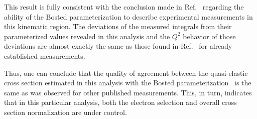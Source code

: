 This result is fully consistent with the conclusion made in Ref.~\cite{note_QE_peak} regarding the ability of the Bosted parameterization to describe experimental measurements in this kinematic region. The deviations of the measured integrals from their parameterized values revealed in this analysis and the $Q^{2}$ behavior of those deviations are almost exactly the same as those found in Ref.~\cite{note_QE_peak} for already established measurements.

 






Thus, one can conclude that the quality of agreement between the quasi-elastic cross section estimated in this analysis  with the Bosted parameterization~\cite{Bosted_fit,Bosted:2007xd} is the same as was observed for other published measurements. This, in turn, indicates that in this particular analysis, both the electron selection and overall cross section normalization are under control.


